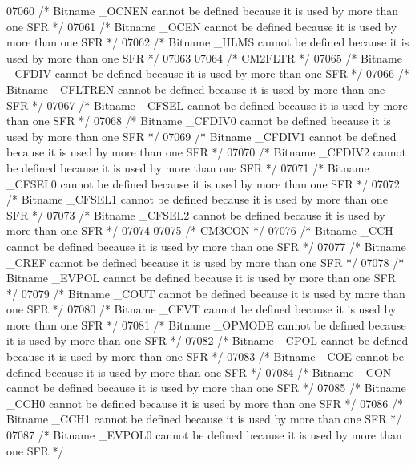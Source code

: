 \begin{DoxyCode}
07060 \textcolor{comment}{/* Bitname \_OCNEN cannot be defined because it is used by more than one SFR */}
07061 \textcolor{comment}{/* Bitname \_OCEN cannot be defined because it is used by more than one SFR */}
07062 \textcolor{comment}{/* Bitname \_HLMS cannot be defined because it is used by more than one SFR */}
07063 
07064 \textcolor{comment}{/* CM2FLTR */}
07065 \textcolor{comment}{/* Bitname \_CFDIV cannot be defined because it is used by more than one SFR */}
07066 \textcolor{comment}{/* Bitname \_CFLTREN cannot be defined because it is used by more than one SFR */}
07067 \textcolor{comment}{/* Bitname \_CFSEL cannot be defined because it is used by more than one SFR */}
07068 \textcolor{comment}{/* Bitname \_CFDIV0 cannot be defined because it is used by more than one SFR */}
07069 \textcolor{comment}{/* Bitname \_CFDIV1 cannot be defined because it is used by more than one SFR */}
07070 \textcolor{comment}{/* Bitname \_CFDIV2 cannot be defined because it is used by more than one SFR */}
07071 \textcolor{comment}{/* Bitname \_CFSEL0 cannot be defined because it is used by more than one SFR */}
07072 \textcolor{comment}{/* Bitname \_CFSEL1 cannot be defined because it is used by more than one SFR */}
07073 \textcolor{comment}{/* Bitname \_CFSEL2 cannot be defined because it is used by more than one SFR */}
07074 
07075 \textcolor{comment}{/* CM3CON */}
07076 \textcolor{comment}{/* Bitname \_CCH cannot be defined because it is used by more than one SFR */}
07077 \textcolor{comment}{/* Bitname \_CREF cannot be defined because it is used by more than one SFR */}
07078 \textcolor{comment}{/* Bitname \_EVPOL cannot be defined because it is used by more than one SFR */}
07079 \textcolor{comment}{/* Bitname \_COUT cannot be defined because it is used by more than one SFR */}
07080 \textcolor{comment}{/* Bitname \_CEVT cannot be defined because it is used by more than one SFR */}
07081 \textcolor{comment}{/* Bitname \_OPMODE cannot be defined because it is used by more than one SFR */}
07082 \textcolor{comment}{/* Bitname \_CPOL cannot be defined because it is used by more than one SFR */}
07083 \textcolor{comment}{/* Bitname \_COE cannot be defined because it is used by more than one SFR */}
07084 \textcolor{comment}{/* Bitname \_CON cannot be defined because it is used by more than one SFR */}
07085 \textcolor{comment}{/* Bitname \_CCH0 cannot be defined because it is used by more than one SFR */}
07086 \textcolor{comment}{/* Bitname \_CCH1 cannot be defined because it is used by more than one SFR */}
07087 \textcolor{comment}{/* Bitname \_EVPOL0 cannot be defined because it is used by more than one SFR */}

\end{DoxyCode}
